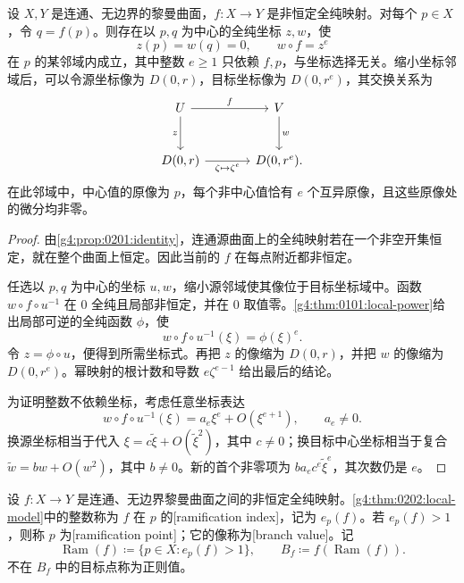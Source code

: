 \begin{theorem}\label{g4:thm:0202:local-model}
	设 \(X,Y\) 是连通、无边界的黎曼曲面，\(f:X\rightarrow Y\) 是非恒定全纯映射。对每个 \(p\in X\)，令 \(q=f(p)\)。则存在以 \(p,q\) 为中心的全纯坐标 \(z,w\)，使
	\[
		z(p)=w(q)=0,\qquad w\circ f=z^e
	\]
	在 \(p\) 的某邻域内成立，其中整数 \(e\geq1\) 只依赖 \(f,p\)，与坐标选择无关。缩小坐标邻域后，可以令源坐标像为 \(D(0,r)\)，目标坐标像为 \(D(0,r^e)\)，其交换关系为
	\[
		\begin{tikzcd}[column sep=large,row sep=large]
			U\arrow[r,"f"]\arrow[d,"z"']&V\arrow[d,"w"]\\
			D(0,r)\arrow[r,"\zeta\mapsto\zeta^e"']&D(0,r^e).
		\end{tikzcd}
	\]
	在此邻域中，中心值的原像为 \(p\)，每个非中心值恰有 \(e\) 个互异原像，且这些原像处的微分均非零。
\end{theorem}
\begin{proof}
	由\cref{g4:prop:0201:identity}，连通源曲面上的全纯映射若在一个非空开集恒定，就在整个曲面上恒定。因此当前的 \(f\) 在每点附近都非恒定。

	任选以 \(p,q\) 为中心的坐标 \(u,w\)，缩小源邻域使其像位于目标坐标域中。函数 \(w\circ f\circ u^{-1}\) 在 \(0\) 全纯且局部非恒定，并在 \(0\) 取值零。\cref{g4:thm:0101:local-power}给出局部可逆的全纯函数 \(\phi\)，使
	\[
		w\circ f\circ u^{-1}(\xi)=\phi(\xi)^e.
	\]
	令 \(z=\phi\circ u\)，便得到所需坐标式。再把 \(z\) 的像缩为 \(D(0,r)\)，并把 \(w\) 的像缩为 \(D(0,r^e)\)。幂映射的根计数和导数 \(e\zeta^{e-1}\) 给出最后的结论。

	为证明整数不依赖坐标，考虑任意坐标表达
	\[
		w\circ f\circ u^{-1}(\xi)=a_e\xi^e+O(\xi^{e+1}),\qquad a_e\neq0.
	\]
	换源坐标相当于代入 \(\xi=c\widetilde\xi+O(\widetilde\xi^2)\)，其中 \(c\neq0\)；换目标中心坐标相当于复合 \(\widetilde w=bw+O(w^2)\)，其中 \(b\neq0\)。新的首个非零项为 \(ba_ec^e\widetilde\xi^e\)，其次数仍是 \(e\)。
\end{proof}

\begin{definition}\label{g4:def:0202:ramification}
	设 \(f:X\rightarrow Y\) 是连通、无边界黎曼曲面之间的非恒定全纯映射。\cref{g4:thm:0202:local-model}中的整数称为 \(f\) 在 \(p\) 的[ramification index]，记为 \(e_p(f)\)。若 \(e_p(f)>1\)，则称 \(p\) 为[ramification point]；它的像称为[branch value]。记
	\[
		\operatorname{Ram}(f)\coloneqq\{p\in X:e_p(f)>1\},\qquad B_f\coloneqq f(\operatorname{Ram}(f)).
	\]
	不在 \(B_f\) 中的目标点称为正则值。
\end{definition}

